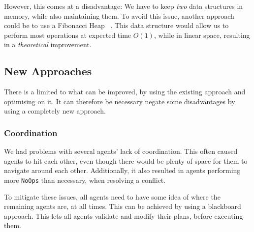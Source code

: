 \documentclass[letterpaper]{article}
\begin{document}
			However, this comes at a disadvantage: We have to keep \emph{two} data structures in memory, while also maintaining them. To avoid this issue, another approach could be to use a Fibonacci Heap ~\cite{fibonacci}. This data structure would allow us to perform most operations at expected time $O(1)$, while in linear space, resulting in a \emph{theoretical} improvement.

	\subsection{New Approaches}
		There is a limited to what can be improved, by using the existing approach and optimising on it. It can therefore be necessary negate some disadvantages by using a completely new approach.

		\subsubsection{Coordination}
			We had problems with several agents' lack of coordination. This often caused agents to hit each other, even though there would be plenty of space for them to navigate around each other. Additionally, it also resulted in agents performing more \verb=NoOps= than necessary, when resolving a conflict.

			To mitigate these issues, all agents need to have some idea of where the remaining agents are, at all times. This can be achieved by using a blackboard approach. This lets all agents validate and modify their plans, before executing them.
\end{document}
